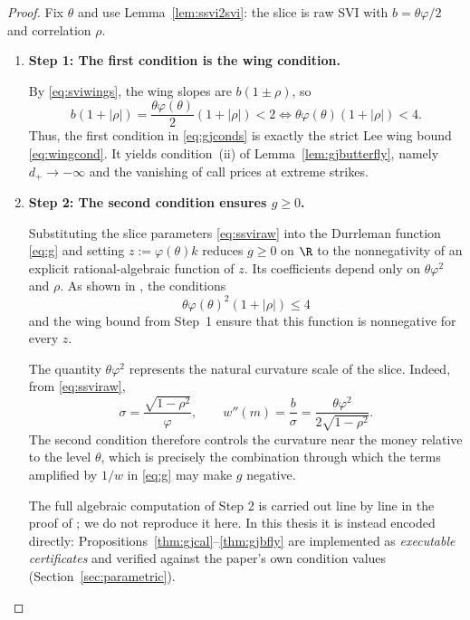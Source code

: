 \begin{proof}
Fix $\theta$ and use Lemma~\ref{lem:ssvi2svi}: the slice is raw SVI with
$b=\theta\varphi/2$ and correlation $\rho$.

\begin{enumerate}[label=\textup{(\roman*)}, leftmargin=*]

\item \textbf{Step 1: The first condition is the wing condition.}

By \eqref{eq:sviwings}, the wing slopes are $b(1\pm\rho)$, so
\[
b(1+|\rho|)
=\frac{\theta\varphi(\theta)}{2}(1+|\rho|)<2
\iff
\theta\varphi(\theta)(1+|\rho|)<4.
\]
Thus, the first condition in \eqref{eq:gjconds} is exactly the strict Lee wing bound
\eqref{eq:wingcond}. It yields condition~(ii) of Lemma~\ref{lem:gjbutterfly}, namely
$d_+\to-\infty$ and the vanishing of call prices at extreme strikes.

\item \textbf{Step 2: The second condition ensures $g\ge0$.}

Substituting the slice parameters \eqref{eq:ssviraw} into the Durrleman function
\eqref{eq:g} and setting $z:=\varphi(\theta)k$ reduces $g\ge0$ on $\R$ to the
nonnegativity of an explicit rational-algebraic function of $z$. Its coefficients depend
only on $\theta\varphi^2$ and $\rho$. As shown in
\cite[Thm.~4.2]{gatheraljacquier2014}, the conditions
\[
\theta\varphi(\theta)^2(1+|\rho|)\le4
\]
and the wing bound from Step~1 ensure that this function is nonnegative for every $z$.

The quantity $\theta\varphi^2$ represents the natural curvature scale of the slice. Indeed,
from \eqref{eq:ssviraw},
\[
\sigma=\frac{\sqrt{1-\rho^2}}{\varphi},
\qquad
w''(m)=\frac{b}{\sigma}
=\frac{\theta\varphi^2}{2\sqrt{1-\rho^2}}.
\]
The second condition therefore controls the curvature near the money relative to the level
$\theta$, which is precisely the combination through which the terms amplified by $1/w$ in
\eqref{eq:g} may make $g$ negative.\medskip

The full algebraic computation of Step 2 is carried out line by line in the proof of
\cite[Thm.~4.2, pp.~14--15]{gatheraljacquier2014}; we do not reproduce it here. In this thesis
it is instead encoded directly: Propositions~\ref{thm:gjcal}--\ref{thm:gjbfly} are implemented as
\emph{executable certificates} and verified against the paper's own condition values
(Section~\ref{sec:parametric}).
\end{enumerate}
\end{proof}

